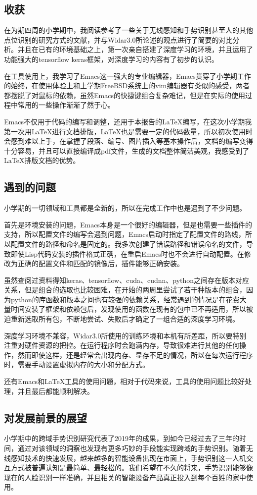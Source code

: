 \documentclass[a4paper]{article}
\begin{document}
\subsection{收获}
  在为期四周的小学期中，我阅读参考了一些关于无线感知和手势识别甚至人的其他点位识别的研究方式的文献，并与Widar3.0所论述的观点进行了简要的对比分析。并且在已有的环境基础之上，第一次亲自搭建了深度学习的环境，并且运用了功能强大的tensorflow keras框架，对深度学习的内容有了初步的认识。 \par
  在工具使用上，我学习了Emacs这一强大的专业编辑器，Emacs贯穿了小学期工作的始终，在使用体验上和上学期FreeBSD系统上的vim编辑器有类似的感受，两者都摆脱了对鼠标的依赖，虽然Emacs的快捷键组合复杂难记，但是在实际的使用过程中常用的一些操作渐渐了然于心。 \par
  Emacs不仅用于代码的编写和调整，还用于本报告的LaTeX编写，在这次小学期我第一次用LaTeX进行文档排版，LaTeX也是需要一定的代码数量，所以初次使用时会感到难以上手，在掌握了段落、编号、图片插入等基本操作后，文档的编写变得十分容易，并且可以直接编译成pdf文件，生成的文档整体简洁美观，我感受到了LaTeX排版文档的优势。
  \subsection{遇到的问题}
  小学期的一切领域和工具都是全新的，所以在完成工作中也是遇到了不少问题。 \par
  首先是环境安装的问题，Emacs本身是一个很好的编辑器，但是也需要一些插件的支持，所以配置文件的编写会遇到问题，Emacs启动时指定了配置文件的路线，所以配置文件的路径和命名是固定的。我多次创建了错误路径和错误命名的文件，导致即使Lisp代码安装的插件格式正确，在重启Emacs时也不会进行自动配置。在修改为正确的配置文件和匹配的镜像后，插件能够正确安装。 \par
  虽然查阅过资料得知keras、tensorflow、cuda、cudnn、python之间存在版本对应关系，但是组合的选取也比较困难，在开始的两周里尝试了若干种版本的组合，因为python的库函数和版本之间也有较强的依赖关系，经常遇到的情况是在花费大量时间安装了框架和依赖包后，发现使用的函数在现有的包中已不再适用，所以被迫重新选取所有包，不断地尝试、失败后才确定了一组合适的深度学习环境。 \par
  深度学习环境不兼容，Widar3.0所使用的训练环境和本机有所差距，所以要特别注重对硬件资源的把控。在运行程序时会跑满内存，导致很难进行其他的任何操作，然而即使这样，还是经常会出现内存、显存不足的情况，所以在每次运行程序时，需要手动设置虚拟内存的大小和分配方式。 \par
  还有Emacs和LaTeX工具的使用问题，相对于代码来说，工具的使用问题比较好处理，并且最后都能顺利解决。
  \subsection{对发展前景的展望}
  小学期中的跨域手势识别研究代表了2019年的成果，到如今已经过去了三年的时间，通过对该领域的洞察也发现有更多巧妙的手段能实现跨域的手势识别。随着无线感知技术的快速发展，越来越多的智能设备出现在市面上，手势识别这一人机交互方式被普遍认知是最简单、最轻松的。我们希望在不久的将来，手势识别能够像现在的人脸识别一样准确，并且相关的智能设备产品真正投入到每个百姓的家中使用。
\end{document}
